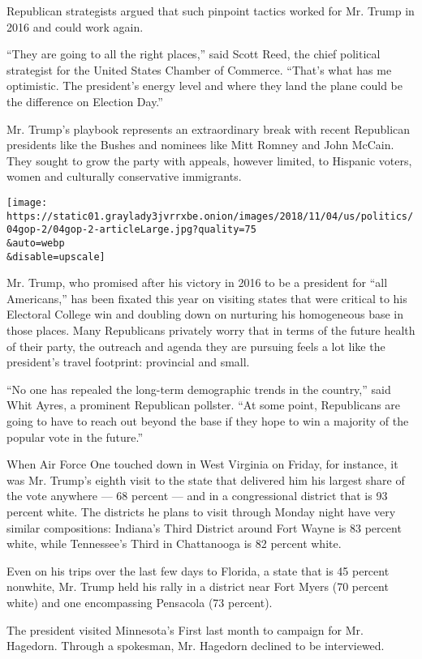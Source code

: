 Republican strategists argued that such pinpoint tactics worked for Mr.
Trump in 2016 and could work again.

``They are going to all the right places,'' said Scott Reed, the chief
political strategist for the United States Chamber of Commerce. ``That's
what has me optimistic. The president's energy level and where they land
the plane could be the difference on Election Day.''

Mr. Trump's playbook represents an extraordinary break with recent
Republican presidents like the Bushes and nominees like Mitt Romney and
John McCain. They sought to grow the party with appeals, however
limited, to Hispanic voters, women and culturally conservative
immigrants.

\texttt{[image: https://static01.graylady3jvrrxbe.onion/images/2018/11/04/us/politics/04gop-2/04gop-2-articleLarge.jpg?quality=75\\\&auto=webp\\\&disable=upscale]}

Mr. Trump, who promised after his victory in 2016 to be a president for
``all Americans,'' has been fixated this year on visiting states that
were critical to his Electoral College win and doubling down on
nurturing his homogeneous base in those places. Many Republicans
privately worry that in terms of the future health of their party, the
outreach and agenda they are pursuing feels a lot like the president's
travel footprint: provincial and small.

``No one has repealed the long-term demographic trends in the country,''
said Whit Ayres, a prominent Republican pollster. ``At some point,
Republicans are going to have to reach out beyond the base if they hope
to win a majority of the popular vote in the future.''

When Air Force One touched down in West Virginia on Friday, for
instance, it was Mr. Trump's eighth visit to the state that delivered
him his largest share of the vote anywhere --- 68 percent --- and in a
congressional district that is 93 percent white. The districts he plans
to visit through Monday night have very similar compositions: Indiana's
Third District around Fort Wayne is 83 percent white, while Tennessee's
Third in Chattanooga is 82 percent white.

Even on his trips over the last few days to Florida, a state that is 45
percent nonwhite, Mr. Trump held his rally in a district near Fort Myers
(70 percent white) and one encompassing Pensacola (73 percent).

The president visited Minnesota's First last month to campaign for Mr.
Hagedorn. Through a spokesman, Mr. Hagedorn declined to be interviewed.


